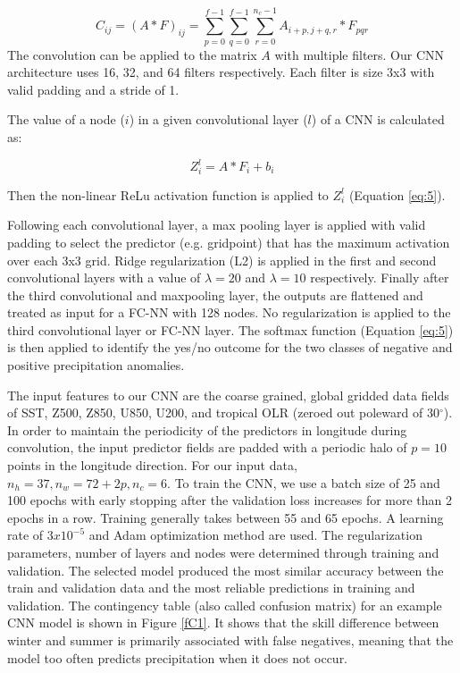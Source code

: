 \documentclass{ametsocV6.1}
\begin{document}
\begin{equation}
\label{eq:7}
C_{ij}=(A*F)_{ij}=\sum_{p=0}^{f-1}\sum_{q=0}^{f-1}\sum_{r=0}^{n_c-1}A_{i+p,j+q,r}*F_{pqr}
\end{equation}
The convolution can be applied to the matrix $A$ with multiple filters. Our CNN architecture uses 16, 32, and 64 filters respectively.  Each filter is size 3x3 with valid padding and a stride of 1. 

The value of a node ($i$) in a given convolutional layer ($l$) of a CNN is calculated as:

\begin{equation}
\label{eq:8}
Z_i^{l}=A*F_i+b_i
\end{equation}

Then the non-linear ReLu activation function is applied to $Z_i^{l}$ (Equation \ref{eq:5}).

Following each convolutional layer, a max pooling layer is applied with valid padding to select the predictor (e.g. gridpoint) that has the maximum activation over each 3x3 grid. Ridge regularization (L2) is applied in the first and second convolutional layers with a value of $\lambda=20$ and $\lambda=10$ respectively.  Finally after the third convolutional and maxpooling layer, the outputs are flattened and treated as input for a FC-NN with 128 nodes. No regularization is applied to the third convolutional layer or FC-NN layer.  The softmax function (Equation \ref{eq:5}) is then applied to identify the yes/no outcome for the two classes of negative and positive precipitation anomalies. 

The input features to our CNN are the coarse grained, global gridded data fields of SST, Z500, Z850, U850, U200, and tropical OLR (zeroed out poleward of 30$^\circ$). In order to maintain the periodicity of the predictors in longitude during convolution, the input predictor fields are padded with a periodic halo of $p=10$ points in the longitude direction.  For our input data, $n_h=37, n_w=72+2p, n_c=6$. To train the CNN, we use a batch size of 25 and 100 epochs with early stopping after the validation loss increases for more than 2 epochs in a row.  Training generally takes between 55 and 65 epochs.  A learning rate of $3x10^{-5}$ and Adam optimization method are used.  The regularization parameters, number of layers and nodes were determined through training and validation.  The selected model produced the most similar accuracy between the train and validation data and the most reliable predictions in training and validation. The contingency table (also called confusion matrix) for an example CNN model is shown in Figure \ref{fC1}. It shows that the skill difference between winter and summer is primarily associated with false negatives, meaning that the model too often predicts precipitation when it does not occur.
\end{document}
